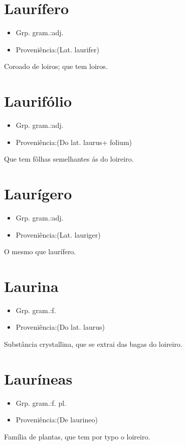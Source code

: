 \section{Laurífero}
\begin{itemize}
\item {Grp. gram.:adj.}
\end{itemize}
\begin{itemize}
\item {Proveniência:(Lat. \textunderscore laurifer\textunderscore )}
\end{itemize}
Coroado de loiros; que tem loiros.
\section{Laurifólio}
\begin{itemize}
\item {Grp. gram.:adj.}
\end{itemize}
\begin{itemize}
\item {Proveniência:(Do lat. \textunderscore laurus\textunderscore  + \textunderscore folium\textunderscore )}
\end{itemize}
Que tem fôlhas semelhantes ás do loireiro.
\section{Laurígero}
\begin{itemize}
\item {Grp. gram.:adj.}
\end{itemize}
\begin{itemize}
\item {Proveniência:(Lat. \textunderscore lauriger\textunderscore )}
\end{itemize}
O mesmo que \textunderscore laurífero\textunderscore .
\section{Laurina}
\begin{itemize}
\item {Grp. gram.:f.}
\end{itemize}
\begin{itemize}
\item {Proveniência:(Do lat. \textunderscore laurus\textunderscore )}
\end{itemize}
Substância crystallina, que se extrai das bagas do loireiro.
\section{Lauríneas}
\begin{itemize}
\item {Grp. gram.:f. pl.}
\end{itemize}
\begin{itemize}
\item {Proveniência:(De \textunderscore laurineo\textunderscore )}
\end{itemize}
Família de plantas, que tem por typo o loireiro.
